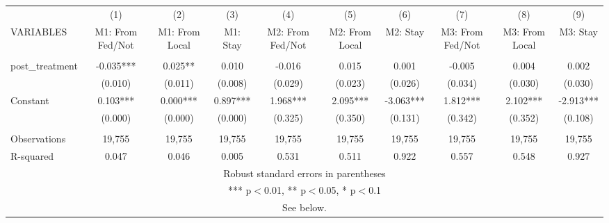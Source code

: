 \begin{tabular}{lccccccccc} \hline
 & (1) & (2) & (3) & (4) & (5) & (6) & (7) & (8) & (9) \\
VARIABLES & M1: From Fed/Not & M1: From Local & M1: Stay & M2: From Fed/Not & M2: From Local & M2: Stay & M3: From Fed/Not & M3: From Local & M3: Stay \\ \hline
 &  &  &  &  &  &  &  &  &  \\
post\_treatment & -0.035*** & 0.025** & 0.010 & -0.016 & 0.015 & 0.001 & -0.005 & 0.004 & 0.002 \\
 & (0.010) & (0.011) & (0.008) & (0.029) & (0.023) & (0.026) & (0.034) & (0.030) & (0.030) \\
Constant & 0.103*** & 0.000*** & 0.897*** & 1.968*** & 2.095*** & -3.063*** & 1.812*** & 2.102*** & -2.913*** \\
 & (0.000) & (0.000) & (0.000) & (0.325) & (0.350) & (0.131) & (0.342) & (0.352) & (0.108) \\
 &  &  &  &  &  &  &  &  &  \\
Observations & 19,755 & 19,755 & 19,755 & 19,755 & 19,755 & 19,755 & 19,755 & 19,755 & 19,755 \\
 R-squared & 0.047 & 0.046 & 0.005 & 0.531 & 0.511 & 0.922 & 0.557 & 0.548 & 0.927 \\ \hline
\multicolumn{10}{c}{ Robust standard errors in parentheses} \\
\multicolumn{10}{c}{ *** p$<$0.01, ** p$<$0.05, * p$<$0.1} \\
\multicolumn{10}{c}{ See below.} \\
\end{tabular}
